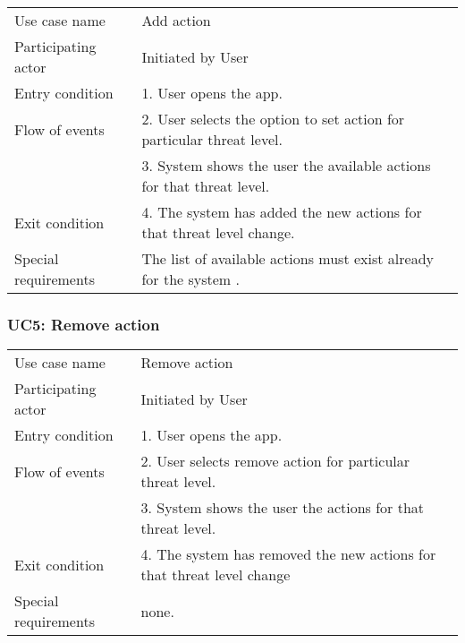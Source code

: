 \begin{tabular}{ l p{11cm} }
	\hline                       
	Use case name & Add action\\
	Participating actor & Initiated by User\\
	Entry condition & 1. User opens the app.\\
	Flow of events & 2. User selects the option to set action for particular threat level.\\
	& 3. System shows the user the available actions for that threat level.\\
	Exit condition & 4. The system has added the new actions for that threat level change.\\
	Special requirements & The list of available actions must exist already for the system .\\
	\hline
\end{tabular}


\subsubsection{UC5: Remove action}

\begin{tabular}{ l p{11cm} }
	\hline                       
	Use case name & Remove action\\
	Participating actor & Initiated by User\\
	Entry condition & 1. User opens the app. \\
	Flow of events & 2. User selects remove action for particular threat level.\\
	& 3. System shows the user the actions for that threat level.\\
	Exit condition & 4. The system has removed the new actions for that threat level change\\
	Special requirements & none. \\
	\hline
\end{tabular}

   		





